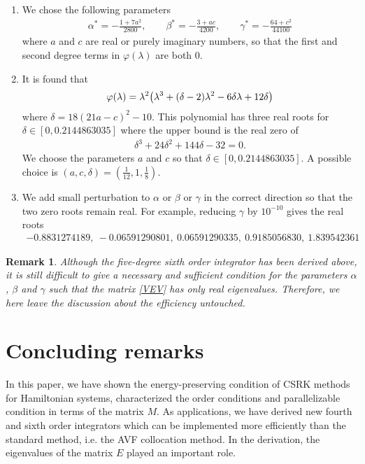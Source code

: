 \documentclass[final,leqno,onefignum,onetabnum]{siamltex1213}
\DeclarePairedDelimiter\paren{\lparen}{\rparen}
\newtheorem{remark}{Remark}
\begin{document}
\begin{enumerate}
\item
We chose the following parameters
\begin{align*}
\alpha^\ast = -\frac{1+7a^2}{2800}, \qquad
\beta^\ast = -\frac{3+ac}{4200}, \qquad
\gamma^\ast = -\frac{64+c^2}{44100}
\end{align*}
where $a$ and $c$ are real or purely imaginary numbers,
so that the first and second degree terms in $\varphi(\lambda)$ are both 0.
\item
It is found that
\begin{align*}
\varphi(\lambda) = \lambda^2  \paren*{\lambda^3 + (\delta-2)\lambda^2
-6\delta\lambda + 12\delta}
\end{align*}
where $\delta = 18(21a-c)^2-10$.
This polynomial has three real roots for $\delta \in [0,0.2144863035]$
where the upper bound is the real zero of 
\begin{align*}
\delta^3 + 24\delta^2 + 144\delta -32 = 0.
\end{align*}
We choose the parameters $a$ and $c$ so that $\delta \in [0,0.2144863035]$.
A possible choice is $(a,c,\delta) = (\frac{1}{12},1,\frac{1}{8})$.
\item
We add small perturbation to $\alpha$ or $\beta$ or $\gamma$
in the correct direction so that the two zero roots remain real.
For example, reducing $\gamma$ by $10^{-10}$ gives the real roots
\begin{align*}
-0.8831274189, \ -0.06591290801, \ 0.06591290335, \ 0.9185056830,\  1.839542361
\end{align*}
\end{enumerate}

\begin{remark}
Although 
the five-degree sixth order integrator has been derived above,
it is still difficult to give a necessary and sufficient condition for 
the parameters $\alpha$, $\beta$ and $\gamma$
such that the matrix \eqref{VEV} has only real eigenvalues.
Therefore, we here leave the discussion about the efficiency untouched.
\end{remark}

\section{Concluding remarks}
\label{sec6}
In this paper,
we have shown the energy-preserving condition of CSRK methods for Hamiltonian systems,
characterized the order conditions and parallelizable condition in terms of the matrix $M$.
As applications, we have derived new fourth and sixth order integrators
which can be implemented more efficiently 
than the standard method, i.e. the AVF collocation method.
In the derivation, the eigenvalues of the matrix $E$ played an important role.
\end{document}
